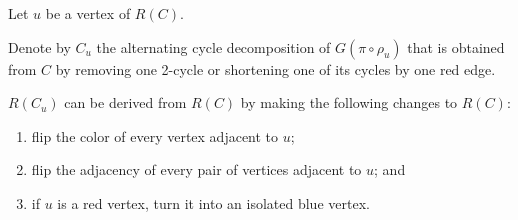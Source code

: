 \documentclass{beamer}
\theoremstyle{definition}
\begin{document}
\begin{frame}

Let $u$ be a vertex of $R(C)$.\pause

\begin{definition}
Denote by $C_u$ the alternating cycle decomposition of $G(\pi \circ \rho_u)$ that is obtained from $C$ by removing one 2-cycle or shortening one of its cycles by one red edge.
\end{definition}\pause

\begin{lemma}
\label{lem:5}
$R(C_u)$ can be derived from $R(C)$ by making the following changes to $R(C)$:\pause
\begin{enumerate}
    \item flip the color of every vertex adjacent to $u$\pause;
    \item flip the adjacency of every pair of vertices adjacent to $u$\pause; and
    \item if $u$ is a red vertex, turn it into an isolated blue vertex.
\end{enumerate}
\end{lemma}

\end{frame}
\end{document}
